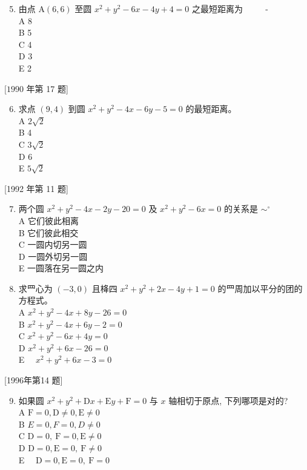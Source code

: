 \documentclass[10pt]{article}
\begin{document}
\begin{enumerate}
  \setcounter{enumi}{4}
  \item 由点 $\mathrm{A}(6,6)$ 至圆 $x^{2}+y^{2}-6 x-4 y+4=0$ 之最短距离为 $\qquad$ -\\
A 8\\
B 5\\
C 4\\
D 3\\
E 2
\end{enumerate}

$[1990$ 年第 17 题]

\begin{enumerate}
  \setcounter{enumi}{5}
  \item 求点 $(9,4)$ 到圆 $x^{2}+y^{2}-4 x-6 y-5=0$ 的最短距离。\\
A $2 \sqrt{2}$\\
B 4\\
C $3 \sqrt{2}$\\
D 6\\
E $5 \sqrt{2}$
\end{enumerate}

[1992 年第 11 题]

\begin{enumerate}
  \setcounter{enumi}{6}
  \item 两个圆 $x^{2}+y^{2}-4 x-2 y-20=0$ 及 $x^{2}+y^{2}-6 x=0$ 的关系是 $\sim^{\circ}$ $\qquad$\\
A 它们彼此相离\\
B 它们彼此相交\\
C 一圆内切另一圆\\
D 一圆外切另一圆\\
E 一圆落在另一圆之内

  \item 求罒心为 $(-3,0)$ 且栙四 $x^{2}+y^{2}+2 x-4 y+1=0$ 的罒周加以平分的团的方程式。\\
A $x^{2}+y^{2}-4 x+8 y-26=0$\\
B $x^{2}+y^{2}-4 x+6 y-2=0$\\
C $x^{2}+y^{2}-6 x+4 y=0$\\
D $x^{2}+y^{2}+6 x-26=0$\\
E $\quad x^{2}+y^{2}+6 x-3=0$

\end{enumerate}

[1996年第14 题]

\begin{enumerate}
  \setcounter{enumi}{8}
  \item 如果圆 $x^{2}+y^{2}+\mathrm{D} x+\mathrm{E} y+\mathrm{F}=0$ 与 $x$ 轴相切于原点, 下列哪项是对的?\\
A $\mathrm{F}=0, \mathrm{D} \neq 0, \mathrm{E} \neq 0$\\
B $E=0, F=0, D \neq 0$\\
C $\mathrm{D}=0, \mathrm{~F}=0, \mathrm{E} \neq 0$\\
D $\mathrm{D}=0, \mathrm{E}=0, \mathrm{~F} \neq 0$\\
E $\quad \mathrm{D}=0, \mathrm{E}=0, \mathrm{~F}=0$
\end{enumerate}
\end{document}
